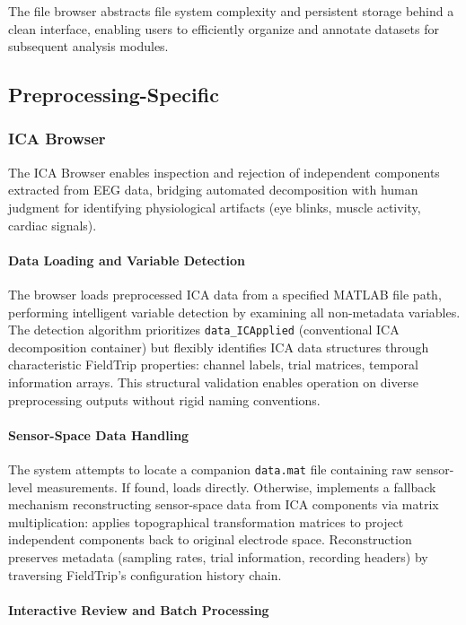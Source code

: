 \documentclass[12pt]{report}
\begin{document}
The file browser abstracts file system complexity and persistent storage behind a clean interface, enabling users to efficiently organize and annotate datasets for subsequent analysis modules.

\subsection{Preprocessing-Specific}
\subsubsection{ICA Browser}

The ICA Browser enables inspection and rejection of independent components extracted from EEG data, bridging automated decomposition with human judgment for identifying physiological artifacts (eye blinks, muscle activity, cardiac signals).

\paragraph{Data Loading and Variable Detection}\mbox{}

The browser loads preprocessed ICA data from a specified MATLAB file path, performing intelligent variable detection by examining all non-metadata variables. The detection algorithm prioritizes \verb|data_ICApplied| (conventional ICA decomposition container) but flexibly identifies ICA data structures through characteristic FieldTrip properties: channel labels, trial matrices, temporal information arrays. This structural validation enables operation on diverse preprocessing outputs without rigid naming conventions.

\paragraph{Sensor-Space Data Handling}\mbox{}

The system attempts to locate a companion \verb|data.mat| file containing raw sensor-level measurements. If found, loads directly. Otherwise, implements a fallback mechanism reconstructing sensor-space data from ICA components via matrix multiplication: applies topographical transformation matrices to project independent components back to original electrode space. Reconstruction preserves metadata (sampling rates, trial information, recording headers) by traversing FieldTrip's configuration history chain.

\paragraph{Interactive Review and Batch Processing}\mbox{}
\end{document}
